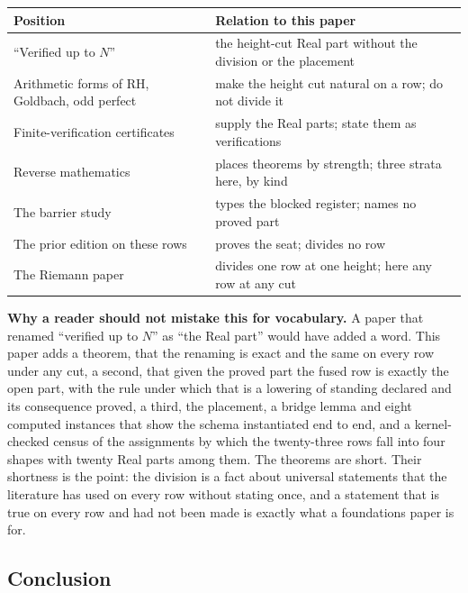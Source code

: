 \documentclass[10pt]{article}
\begin{document}
\begin{table}[!h]
\centering\scriptsize
\renewcommand{\arraystretch}{1.15}
\begin{tabularx}{\columnwidth}{@{}P{0.27\columnwidth} L@{}}
\toprule
\textbf{Position} & \textbf{Relation to this paper} \\
\midrule
``Verified up to $N$'' & the height-cut Real part without the division or the placement \\
Arithmetic forms of RH, Goldbach, odd perfect & make the height cut natural on a row; do not divide it \\
Finite-verification certificates & supply the Real parts; state them as verifications \\
Reverse mathematics & places theorems by strength; three strata here, by kind \\
The barrier study & types the blocked register; names no proved part \\
The prior edition on these rows & proves the seat; divides no row \\
The Riemann paper & divides one row at one height; here any row at any cut \\
\bottomrule
\end{tabularx}
\end{table}

\textbf{Why a reader should not mistake this for vocabulary.} A paper
that renamed ``verified up to \(N\)'' as ``the Real part'' would have
added a word. This paper adds a theorem, that the renaming is exact and
the same on every row under any cut, a second, that given the proved
part the fused row is exactly the open part, with the rule under which
that is a lowering of standing declared and its consequence proved, a
third, the placement, a bridge lemma and eight computed instances that
show the schema instantiated end to end, and a kernel-checked census of
the assignments by which the twenty-three rows fall into four shapes
with twenty Real parts among them. The theorems are short. Their
shortness is the point: the division is a fact about universal
statements that the literature has used on every row without stating
once, and a statement that is true on every row and had not been made is
exactly what a foundations paper is for.

\hypertarget{conclusion}{%
\subsection{Conclusion}\label{conclusion}}
\end{document}
